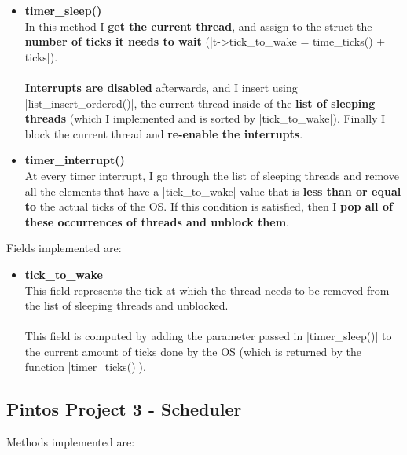 \documentclass{article}
\begin{document}
\begin{itemize}
	\item \textbf{timer\_sleep()}
	\vspace{.2cm} \\
	In this method I \textbf{get the current thread}, and assign to the struct the \textbf{number of ticks it needs to wait} (\cverb|t->tick_to_wake = time_ticks() + ticks|). \\ \\
	\textbf{Interrupts are disabled} afterwards, and I insert using \cverb|list_insert_ordered()|, the current thread inside of the \textbf{list of sleeping threads} (which I implemented and is sorted by \cverb|tick_to_wake|). Finally I block the current thread and \textbf{re-enable the interrupts}.
	
	\item \textbf{timer\_interrupt()}
	\vspace{.2cm} \\
	At every timer interrupt, I go through the list of sleeping threads and remove all the elements that have a \cverb|tick_to_wake| value that is \textbf{less than or equal to} the actual ticks of the OS. If this condition is satisfied, then I \textbf{pop all of these occurrences of threads and unblock them}.
\end{itemize}
Fields implemented are:

\begin{itemize}
	\item \textbf{tick\_to\_wake}
	\vspace{.2cm} \\
	This field represents the tick at which the thread needs to be removed from the list of sleeping threads and unblocked. \\ \\
	This field is computed by adding the parameter passed in \cverb|timer_sleep()| to the current amount of ticks done by the OS (which is returned by the function \cverb|timer_ticks()|).
\end{itemize}

\subsection{Pintos Project 3 - Scheduler}
Methods implemented are:
\end{document}
